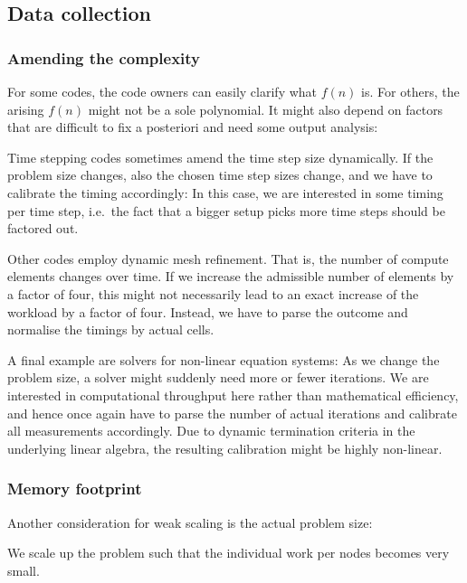 \subsection{Data collection}

\subsubsection{Amending the complexity}

For some codes, the code owners can easily clarify what $f(n)$ is.
For others, the arising $f(n)$ might not be a sole polynomial.
It might also depend on factors that are difficult to fix a posteriori and need some output analysis:

Time stepping codes sometimes amend the time step size dynamically.
If the problem size changes, also the chosen time step sizes change, and we have to calibrate the timing accordingly:
In this case, we are interested in some timing per time step, i.e.~the fact that a bigger setup picks more time steps should be factored out.

Other codes employ dynamic mesh refinement.
That is, the number of compute elements changes over time.
If we increase the admissible number of elements by a factor of four, this might not necessarily lead to an exact increase of the workload by a factor of four.
Instead, we have to parse the outcome and normalise the timings by actual cells.

A final example are solvers for non-linear equation systems:
As we change the problem size, a solver might suddenly need more or fewer iterations.
We are interested in computational throughput here rather than mathematical efficiency, and hence once again have to parse the number of actual iterations and calibrate all measurements accordingly.
Due to dynamic termination criteria in the underlying linear algebra, the resulting calibration might be highly non-linear.

\subsubsection{Memory footprint}

Another consideration for weak scaling is the actual problem size:

\begin{assessmentcrime}
 We scale up the problem such that the individual work per nodes becomes very small.
\end{assessmentcrime}

